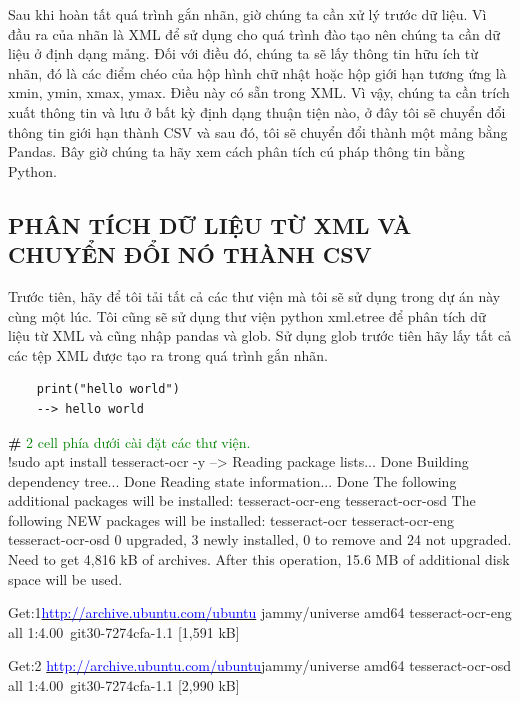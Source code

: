 \documentclass{article}
\begin{document}
Sau khi hoàn tất quá trình gắn nhãn, giờ chúng ta cần xử lý trước dữ liệu. Vì đầu ra của nhãn là XML để sử dụng cho quá trình đào tạo nên chúng ta cần dữ liệu ở định dạng mảng. Đối với điều đó, chúng ta sẽ lấy thông tin hữu ích từ nhãn, đó là các điểm chéo của hộp hình chữ nhật hoặc hộp giới hạn tương ứng là xmin, ymin, xmax, ymax. Điều này có sẵn trong XML. Vì vậy, chúng ta cần trích xuất thông tin và lưu ở bất kỳ định dạng thuận tiện nào, ở đây tôi sẽ chuyển đổi thông tin giới hạn thành CSV và sau đó, tôi sẽ chuyển đổi thành một mảng bằng Pandas. Bây giờ chúng ta hãy xem cách phân tích cú pháp thông tin bằng Python.

\subsection{PHÂN TÍCH DỮ LIỆU TỪ XML VÀ CHUYỂN ĐỔI NÓ THÀNH CSV}

Trước tiên, hãy để tôi tải tất cả các thư viện mà tôi sẽ sử dụng trong dự án này cùng một lúc. Tôi cũng sẽ sử dụng thư viện python xml.etree để phân tích dữ liệu từ XML và cũng nhập pandas và glob. Sử dụng glob trước tiên hãy lấy tất cả các tệp XML được tạo ra trong quá trình gắn nhãn.\\
\begin{verbatim}
    print("hello world")
    --> hello world
\end{verbatim}

\textbf{\#} \textcolor{green}{2 cell phía dưới cài đặt các thư viện.}\\

!sudo apt install tesseract-ocr -y
-->
    Reading package lists... Done
Building dependency tree... Done
Reading state information... Done
The following additional packages will be installed:
  tesseract-ocr-eng tesseract-ocr-osd
The following NEW packages will be installed:
  tesseract-ocr tesseract-ocr-eng tesseract-ocr-osd
0 upgraded, 3 newly installed, 0 to remove and 24 not upgraded.
Need to get 4,816 kB of archives.
After this operation, 15.6 MB of additional disk space will be used.

Get:1\href{http://archive.ubuntu.com/ubuntu}{\textcolor{blue}{http://archive.ubuntu.com/ubuntu}} jammy/universe amd64 tesseract-ocr-eng all 1:4.00~git30-7274cfa-1.1 [1,591 kB]

Get:2 \href{http://archive.ubuntu.com/ubuntu}{\textcolor{blue}{http://archive.ubuntu.com/ubuntu}}jammy/universe amd64 tesseract-ocr-osd all 1:4.00~git30-7274cfa-1.1 [2,990 kB]
\end{document}
